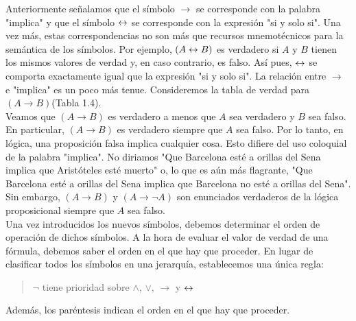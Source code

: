 \message{ !name(main.tex)}\documentclass[12pt,a4paper]{book}
\newcommand{\comillas}[1]{"#1"}
\begin{document}
    Anteriormente señalamos que el símbolo $\rightarrow$ se corresponde con la palabra \comillas{implica} y que el símbolo $\leftrightarrow$ se corresponde con la
    expresión \comillas{si y solo si}. Una vez más, estas correspondencias no son más que recursos mnemotécnicos para la semántica de los símbolos.
    Por ejemplo, $(A\leftrightarrow B)$ es verdadero si $A$ y $B$ tienen los mismos valores de verdad y, en caso contrario, es falso. Así pues, $\leftrightarrow$ se comporta
    exactamente igual que la expresión \comillas{si y solo si}. La relación entre $\rightarrow$ e \comillas{implica} es un poco más tenue. Consideremos
    la tabla de verdad para $(A\rightarrow B)$(Tabla 1.4).\\
    Veamos que  $(A\rightarrow B)$ es verdadero a menos que $A$ sea verdadero y $B$ sea falso. En particular, $(A\rightarrow B)$ es verdadero siempre que $A$
    sea falso. Por lo tanto, en lógica, una proposición falsa implica cualquier cosa. Esto difiere del uso coloquial de la palabra \comillas{implica}. No
    diriamos \comillas{Que Barcelona esté a orillas del Sena implica que Aristóteles esté muerto} o, lo que es aún más flagrante, \comillas{Que Barcelona esté a orillas
    del Sena implica que Barcelona no esté a orillas del Sena}. Sin embargo, $(A\rightarrow B)$ y $(A\rightarrow\neg A)$ son enunciados verdaderos de la
    lógica proposicional siempre que $A$ sea falso.\\
    Una vez introducidos los nuevos símbolos, debemos determinar el orden de operación de dichos símbolos. A la hora de evaluar el valor de verdad de una fórmula,
    debemos saber el orden en el que hay que proceder. En lugar de clasificar todos los símbolos en una jerarquía, establecemos una única regla:

    \begin{quote}
        $\neg$ tiene prioridad sobre $\wedge$, $\vee$, $\rightarrow$ y $\leftrightarrow$
    \end{quote}

    Además, los paréntesis indican el orden en el que hay que proceder.
\end{document}
